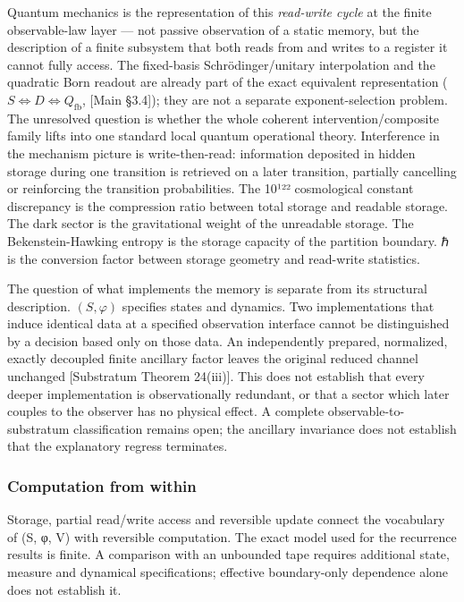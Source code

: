 \documentclass[
]{article}
\begin{document}
Quantum mechanics is the representation of this \emph{read-write cycle}
at the finite observable-law layer --- not passive observation of a
static memory, but the description of a finite subsystem that both reads
from and writes to a register it cannot fully access. The fixed-basis
Schrödinger/unitary interpolation and the quadratic Born readout are
already part of the exact equivalent representation
(\(S \iff D \iff Q_{\mathrm{fb}}\), {[}Main §3.4{]}); they are not a
separate exponent-selection problem. The unresolved question is whether
the whole coherent intervention/composite family lifts into one standard
local quantum operational theory. Interference in the mechanism picture
is write-then-read: information deposited in hidden storage during one
transition is retrieved on a later transition, partially cancelling or
reinforcing the transition probabilities. The 10¹²² cosmological
constant discrepancy is the compression ratio between total storage and
readable storage. The dark sector is the gravitational weight of the
unreadable storage. The Bekenstein-Hawking entropy is the storage
capacity of the partition boundary. ℏ is the conversion factor between
storage geometry and read-write statistics.

The question of what implements the memory is separate from its
structural description. \((S,\varphi)\) specifies states and dynamics.
Two implementations that induce identical data at a specified
observation interface cannot be distinguished by a decision based only
on those data. An independently prepared, normalized, exactly decoupled
finite ancillary factor leaves the original reduced channel unchanged
{[}Substratum Theorem 24(iii){]}. This does not establish that every
deeper implementation is observationally redundant, or that a sector
which later couples to the observer has no physical effect. A complete
observable-to-substratum classification remains open; the ancillary
invariance does not establish that the explanatory regress terminates.

\hypertarget{computation-from-within}{%
\subsubsection{Computation from within}\label{computation-from-within}}

Storage, partial read/write access and reversible update connect the
vocabulary of (S, φ, V) with reversible computation. The exact model
used for the recurrence results is finite. A comparison with an
unbounded tape requires additional state, measure and dynamical
specifications; effective boundary-only dependence alone does not
establish it.
\end{document}
